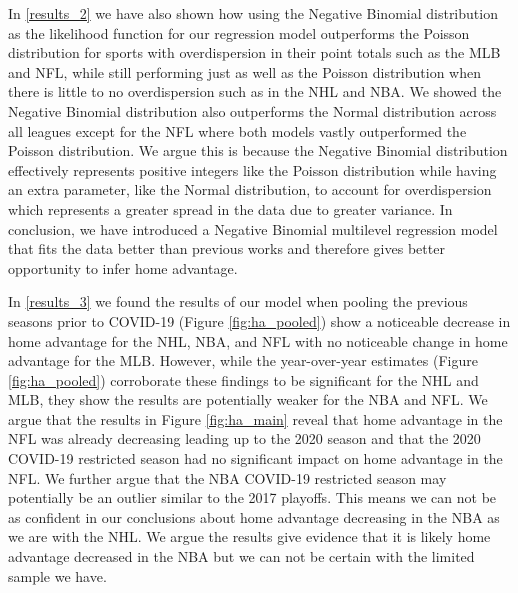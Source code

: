 In \ref{results_2} we have also shown how using the Negative Binomial distribution as the likelihood function for our regression model outperforms the Poisson distribution for sports with overdispersion in their point totals such as the MLB and NFL, while still performing just as well as the Poisson distribution when there is little to no overdispersion such as in the NHL and NBA. We showed the Negative Binomial distribution also outperforms the Normal distribution across all leagues except for the NFL where both models vastly outperformed the Poisson distribution. We argue this is because the Negative Binomial distribution effectively represents positive integers like the Poisson distribution while having an extra parameter, like the Normal distribution, to account for overdispersion which represents a greater spread in the data due to greater variance. In conclusion, we have introduced a Negative Binomial multilevel regression model that fits the data better than previous works and therefore gives better opportunity to infer home advantage.

In \ref{results_3} we found the results of our model when pooling the previous seasons prior to COVID-19 (Figure \mbox{\ref{fig:ha_pooled}}) show a noticeable decrease in home advantage for the NHL, NBA, and NFL with no noticeable change in home advantage for the MLB. However, while the year-over-year estimates (Figure \mbox{\ref{fig:ha_pooled}}) corroborate these findings to be significant for the NHL and MLB, they show the results are potentially weaker for the NBA and NFL. We argue that the results in Figure \mbox{\ref{fig:ha_main}} reveal that home advantage in the NFL was already decreasing leading up to the 2020 season and that the 2020 COVID-19 restricted season had no significant impact on home advantage in the NFL. We further argue that the NBA COVID-19 restricted season may potentially be an outlier similar to the 2017 playoffs. This means we can not be as confident in our conclusions about home advantage decreasing in the NBA as we are with the NHL. We argue the results give evidence that it is likely home advantage decreased in the NBA but we can not be certain with the limited sample we have.